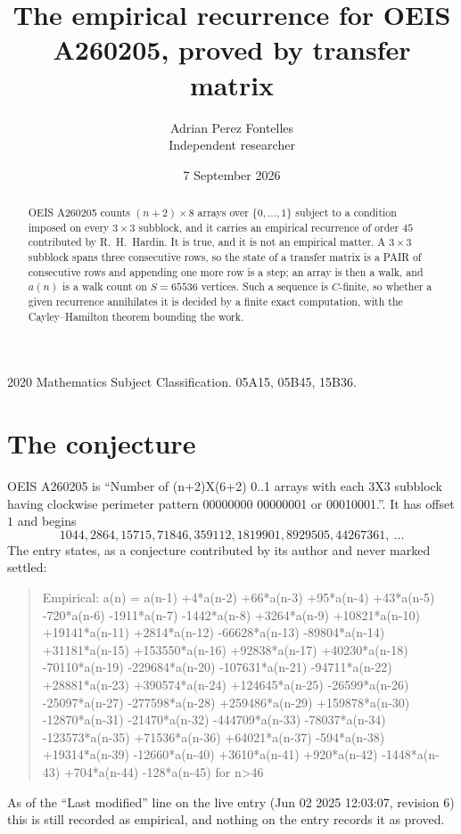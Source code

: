 \documentclass[11pt,a4paper]{article}
\title{The empirical recurrence for OEIS A260205, proved by transfer matrix}
\author{Adrian Perez Fontelles\\ \small Independent researcher}
\date{7 September 2026}
\theoremstyle{plain}
\theoremstyle{definition}
\begin{document}
\maketitle

\begin{abstract}
OEIS A260205 counts $(n+2)\times8$ arrays over $\{0,\dots,1\}$ subject to a condition imposed on
every $3\times3$ subblock, and it carries an empirical recurrence of order $45$
contributed by R.~H.~Hardin. It is true, and it is not an empirical matter. A $3\times3$
subblock spans three consecutive rows, so the state of a transfer matrix is a PAIR of
consecutive rows and appending one more row is a step; an array is then a walk, and
$a(n)$ is a walk count on $S=65536$ vertices. Such a sequence is $C$-finite, so whether a given
recurrence annihilates it is decided by a finite exact computation, with the Cayley--Hamilton
theorem bounding the work.
\end{abstract}

\noindent\small 2020 Mathematics Subject Classification. 05A15, 05B45, 15B36.\normalsize

\section{The conjecture}

OEIS A260205 is ``Number of (n+2)X(6+2) 0..1 arrays with each 3X3 subblock having clockwise perimeter pattern 00000000 00000001 or 00010001.''. It has offset $1$ and begins
\[
1044, 2864, 15715, 71846, 359112, 1819901, 8929505, 44267361,\ \dots
\]
The entry states, as a conjecture contributed by its author and never marked settled:
\begin{quote}
Empirical: a(n) = a(n-1) +4*a(n-2) +66*a(n-3) +95*a(n-4) +43*a(n-5) -720*a(n-6) -1911*a(n-7) -1442*a(n-8) +3264*a(n-9) +10821*a(n-10) +19141*a(n-11) +2814*a(n-12) -66628*a(n-13) -89804*a(n-14) +31181*a(n-15) +153550*a(n-16) +92838*a(n-17) +40230*a(n-18) -70110*a(n-19) -229684*a(n-20) -107631*a(n-21) -94711*a(n-22) +28881*a(n-23) +390574*a(n-24) +124645*a(n-25) -26599*a(n-26) -25097*a(n-27) -277598*a(n-28) +259486*a(n-29) +159878*a(n-30) -12870*a(n-31) -21470*a(n-32) -444709*a(n-33) -78037*a(n-34) -123573*a(n-35) +71536*a(n-36) +64021*a(n-37) -594*a(n-38) +19314*a(n-39) -12660*a(n-40) +3610*a(n-41) +920*a(n-42) -1448*a(n-43) +704*a(n-44) -128*a(n-45) for n>46
\end{quote}
As of the ``Last modified'' line on the live entry (Jun 02 2025 12:03:07, revision 6) this is still
recorded as empirical, and nothing on the entry records it as proved.
\end{document}
